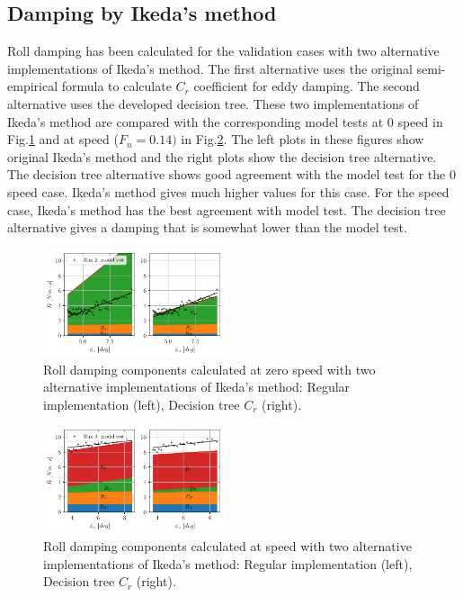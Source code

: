 \subsection*{Damping by Ikeda's method}\label{damping-by-ikedas-method}
Roll damping has been calculated for the validation cases with two
alternative implementations of Ikeda's method. The first alternative
uses the original semi-empirical formula to calculate $C_r$
coefficient for eddy damping. The second alternative uses the developed
decision tree. These two implementations of Ikeda's method are compared
with the corresponding model tests at 0 speed in
Fig.\ref{fig:ikeda} and at speed ($F_n=0.14)$ in
Fig.\ref{fig:ikeda_speed}. The left plots in these figures show
original Ikeda's method and the right plots show the decision tree
alternative. The decision tree alternative shows good agreement with the
model test for the 0 speed case. Ikeda's method gives much higher values
for this case. For the speed case, Ikeda's method has the best agreement
with model test. The decision tree alternative gives a damping that is
somewhat lower than the model test.
\begin{figure}[H]
\begin{center}\includegraphics[width = 0.475\textwidth]{figures/ikeda.pdf}\end{center}
\vspace{-1cm}
\caption{Roll damping components calculated at zero speed with two alternative implementations of Ikeda's method: Regular implementation (left), Decision tree $C_r$ (right).}
\label{fig:ikeda}
\end{figure}
\begin{figure}[H]
\begin{center}\includegraphics[width = 0.475\textwidth]{figures/ikeda_speed.pdf}\end{center}
\vspace{-1cm}
\caption{Roll damping components calculated at speed with two alternative implementations of Ikeda's method: Regular implementation (left), Decision tree $C_r$ (right).}
\label{fig:ikeda_speed}
\end{figure}
